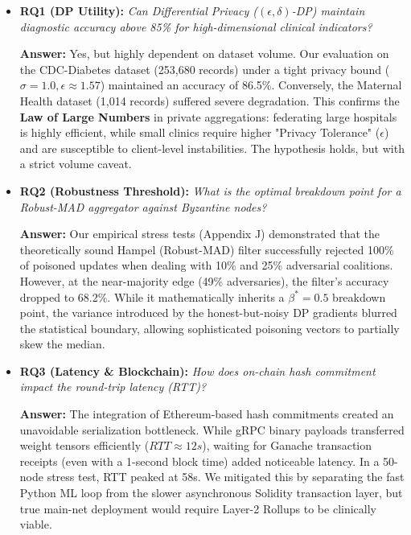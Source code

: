 \documentclass[10pt, a4paper, twocolumn]{article}
\begin{document}
\begin{itemize}
    \item \textbf{RQ1 (DP Utility):} \textit{Can Differential Privacy ($(\epsilon, \delta)$-DP) maintain diagnostic accuracy above 85\% for high-dimensional clinical indicators?} 
    
    \textbf{Answer:} Yes, but highly dependent on dataset volume. Our evaluation on the CDC-Diabetes dataset (253,680 records) under a tight privacy bound ($\sigma=1.0, \epsilon \approx 1.57$) maintained an accuracy of 86.5\%. Conversely, the Maternal Health dataset (1,014 records) suffered severe degradation. This confirms the \textbf{Law of Large Numbers} in private aggregations: federating large hospitals is highly efficient, while small clinics require higher "Privacy Tolerance" ($\epsilon$) and are susceptible to client-level instabilities. The hypothesis holds, but with a strict volume caveat.

    \item \textbf{RQ2 (Robustness Threshold):} \textit{What is the optimal breakdown point for a Robust-MAD aggregator against Byzantine nodes?}
    
    \textbf{Answer:} Our empirical stress tests (Appendix J) demonstrated that the theoretically sound Hampel (Robust-MAD) filter successfully rejected 100\% of poisoned updates when dealing with 10\% and 25\% adversarial coalitions. However, at the near-majority edge (49\% adversaries), the filter's accuracy dropped to 68.2\%. While it mathematically inherits a $\beta^* = 0.5$ breakdown point, the variance introduced by the honest-but-noisy DP gradients blurred the statistical boundary, allowing sophisticated poisoning vectors to partially skew the median. 

    \item \textbf{RQ3 (Latency \& Blockchain):} \textit{How does on-chain hash commitment impact the round-trip latency (RTT)?}
    
    \textbf{Answer:} The integration of Ethereum-based hash commitments created an unavoidable serialization bottleneck. While gRPC binary payloads transferred weight tensors efficiently ($RTT \approx 12s$), waiting for Ganache transaction receipts (even with a 1-second block time) added noticeable latency. In a 50-node stress test, RTT peaked at 58s. We mitigated this by separating the fast Python ML loop from the slower asynchronous Solidity transaction layer, but true main-net deployment would require Layer-2 Rollups to be clinically viable.
\end{itemize}
\end{document}
